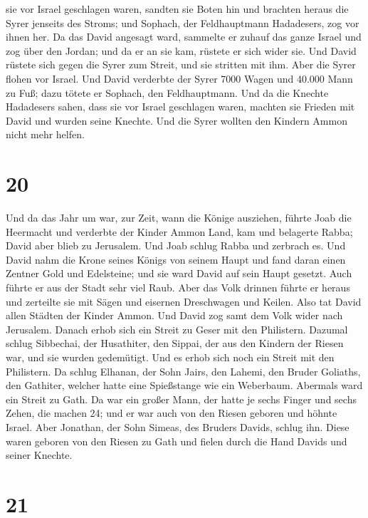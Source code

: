 sie vor Israel geschlagen waren, sandten sie Boten hin und brachten
heraus die Syrer jenseits des Stroms; und Sophach, der Feldhauptmann
Hadadesers, zog vor ihnen her.  Da das David angesagt
ward, sammelte er zuhauf das ganze Israel und zog über den Jordan; und
da er an sie kam, rüstete er sich wider sie. Und David rüstete sich
gegen die Syrer zum Streit, und sie stritten mit ihm. 
Aber die Syrer flohen vor Israel. Und David verderbte der Syrer 7000
Wagen und 40.000 Mann zu Fuß; dazu tötete er Sophach, den Feldhauptmann.
 Und da die Knechte Hadadesers sahen, dass sie vor Israel
geschlagen waren, machten sie Frieden mit David und wurden seine
Knechte. Und die Syrer wollten den Kindern Ammon nicht mehr helfen.

\hypertarget{section-19}{%
\section{20}\label{section-19}}

 Und da das Jahr um war, zur Zeit, wann die Könige
ausziehen, führte Joab die Heermacht und verderbte der Kinder Ammon
Land, kam und belagerte Rabba; David aber blieb zu Jerusalem. Und Joab
schlug Rabba und zerbrach es.  Und David nahm die Krone
seines Königs von seinem Haupt und fand daran einen Zentner Gold und
Edelsteine; und sie ward David auf sein Haupt gesetzt. Auch führte er
aus der Stadt sehr viel Raub.  Aber das Volk drinnen
führte er heraus und zerteilte sie mit Sägen und eisernen Dreschwagen
und Keilen. Also tat David allen Städten der Kinder Ammon. Und David zog
samt dem Volk wider nach Jerusalem.  Danach erhob sich ein
Streit zu Geser mit den Philistern. Dazumal schlug Sibbechai, der
Husathiter, den Sippai, der aus den Kindern der Riesen war, und sie
wurden gedemütigt.  Und es erhob sich noch ein Streit mit
den Philistern. Da schlug Elhanan, der Sohn Jairs, den Lahemi, den
Bruder Goliaths, den Gathiter, welcher hatte eine Spießstange wie ein
Weberbaum.  Abermals ward ein Streit zu Gath. Da war ein
großer Mann, der hatte je sechs Finger und sechs Zehen, die machen 24;
und er war auch von den Riesen geboren  und höhnte Israel.
Aber Jonathan, der Sohn Simeas, des Bruders Davids, schlug ihn.
 Diese waren geboren von den Riesen zu Gath und fielen
durch die Hand Davids und seiner Knechte.

\hypertarget{section-20}{%
\section{21}\label{section-20}}

